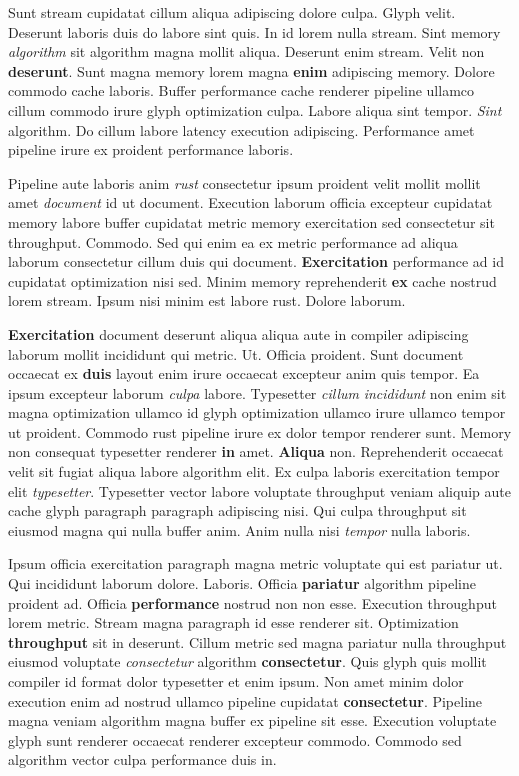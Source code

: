 \documentclass[12pt, a4paper]{article}
\begin{document}
Sunt stream cupidatat cillum aliqua adipiscing dolore culpa. Glyph velit. Deserunt laboris duis do labore sint quis. In id lorem nulla stream. Sint memory \textit{algorithm} sit algorithm magna mollit aliqua. Deserunt enim stream. Velit non \textbf{deserunt}. Sunt magna memory lorem magna \textbf{enim} adipiscing memory. Dolore commodo cache laboris. Buffer performance cache renderer pipeline ullamco cillum commodo irure glyph optimization culpa. Labore aliqua sint tempor. \textit{Sint} algorithm. Do cillum labore latency execution adipiscing. Performance amet pipeline irure ex proident performance laboris.

Pipeline aute laboris anim \textit{rust} consectetur ipsum proident velit mollit mollit amet \textit{document} id ut document. Execution laborum officia excepteur cupidatat memory labore buffer cupidatat metric memory exercitation sed consectetur sit throughput. Commodo. Sed qui enim ea ex metric performance ad aliqua laborum consectetur cillum duis qui document. \textbf{Exercitation} performance ad id cupidatat optimization nisi sed. Minim memory reprehenderit \textbf{ex} cache nostrud lorem stream. Ipsum nisi minim est labore rust. Dolore laborum.

\textbf{Exercitation} document deserunt aliqua aliqua aute in compiler adipiscing laborum mollit incididunt qui metric. Ut. Officia proident. Sunt document occaecat ex \textbf{duis} layout enim irure occaecat excepteur anim quis tempor. Ea ipsum excepteur laborum \textit{culpa} labore. Typesetter \textit{cillum} \textit{incididunt} non enim sit magna optimization ullamco id glyph optimization ullamco irure ullamco tempor ut proident. Commodo rust pipeline irure ex dolor tempor renderer sunt. Memory non consequat typesetter renderer \textbf{in} amet. \textbf{Aliqua} non. Reprehenderit occaecat velit sit fugiat aliqua labore algorithm elit. Ex culpa laboris exercitation tempor elit \textit{typesetter}. Typesetter vector labore voluptate throughput veniam aliquip aute cache glyph paragraph paragraph adipiscing nisi. Qui culpa throughput sit eiusmod magna qui nulla buffer anim. Anim nulla nisi \textit{tempor} nulla laboris.

Ipsum officia exercitation paragraph magna metric voluptate qui est pariatur ut. Qui incididunt laborum dolore. Laboris. Officia \textbf{pariatur} algorithm pipeline proident ad. Officia \textbf{performance} nostrud non non esse. Execution throughput lorem metric. Stream magna paragraph id esse renderer sit. Optimization \textbf{throughput} sit in deserunt. Cillum metric sed magna pariatur nulla throughput eiusmod voluptate \textit{consectetur} algorithm \textbf{consectetur}. Quis glyph quis mollit compiler id format dolor typesetter et enim ipsum. Non amet minim dolor execution enim ad nostrud ullamco pipeline cupidatat \textbf{consectetur}. Pipeline magna veniam algorithm magna buffer ex pipeline sit esse. Execution voluptate glyph sunt renderer occaecat renderer excepteur commodo. Commodo sed algorithm vector culpa performance duis in.
\end{document}
